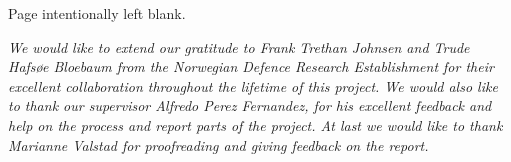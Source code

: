 \vspace*{\fill}
\begin{center}
Page intentionally left blank.
\end{center}
\vspace*{\fill}

\pagebreak

\vspace*{7cm}
\begin{center}

\emph{We would like to extend our gratitude to Frank Trethan Johnsen and Trude Hafsøe Bloebaum from the Norwegian Defence Research Establishment for their excellent collaboration throughout the lifetime of this project. We would also like to thank our supervisor Alfredo Perez Fernandez, for his excellent feedback and help on the process and report parts of the project. At last we would like to thank Marianne Valstad for proofreading and giving feedback on the report.}

\end{center}